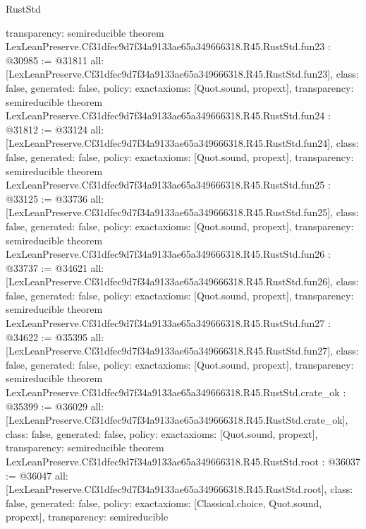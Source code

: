 \begin{lexlean}{RustStd}
\begin{coremodule}
{  transparency: semireducible
}
theorem LexLeanPreserve.Cf31dfec9d7f34a9133ae65a349666318.R45.RustStd.fun23 : @30985 := @31811 {
  all: [LexLeanPreserve.Cf31dfec9d7f34a9133ae65a349666318.R45.RustStd.fun23],
  class: false,
  generated: false,
  policy: exact{axioms: [Quot.sound, propext]},
  transparency: semireducible
}
theorem LexLeanPreserve.Cf31dfec9d7f34a9133ae65a349666318.R45.RustStd.fun24 : @31812 := @33124 {
  all: [LexLeanPreserve.Cf31dfec9d7f34a9133ae65a349666318.R45.RustStd.fun24],
  class: false,
  generated: false,
  policy: exact{axioms: [Quot.sound, propext]},
  transparency: semireducible
}
theorem LexLeanPreserve.Cf31dfec9d7f34a9133ae65a349666318.R45.RustStd.fun25 : @33125 := @33736 {
  all: [LexLeanPreserve.Cf31dfec9d7f34a9133ae65a349666318.R45.RustStd.fun25],
  class: false,
  generated: false,
  policy: exact{axioms: [Quot.sound, propext]},
  transparency: semireducible
}
theorem LexLeanPreserve.Cf31dfec9d7f34a9133ae65a349666318.R45.RustStd.fun26 : @33737 := @34621 {
  all: [LexLeanPreserve.Cf31dfec9d7f34a9133ae65a349666318.R45.RustStd.fun26],
  class: false,
  generated: false,
  policy: exact{axioms: [Quot.sound, propext]},
  transparency: semireducible
}
theorem LexLeanPreserve.Cf31dfec9d7f34a9133ae65a349666318.R45.RustStd.fun27 : @34622 := @35395 {
  all: [LexLeanPreserve.Cf31dfec9d7f34a9133ae65a349666318.R45.RustStd.fun27],
  class: false,
  generated: false,
  policy: exact{axioms: [Quot.sound, propext]},
  transparency: semireducible
}
theorem LexLeanPreserve.Cf31dfec9d7f34a9133ae65a349666318.R45.RustStd.crate_ok : @35399 := @36029 {
  all: [LexLeanPreserve.Cf31dfec9d7f34a9133ae65a349666318.R45.RustStd.crate_ok],
  class: false,
  generated: false,
  policy: exact{axioms: [Quot.sound, propext]},
  transparency: semireducible
}
theorem LexLeanPreserve.Cf31dfec9d7f34a9133ae65a349666318.R45.RustStd.root : @36037 := @36047 {
  all: [LexLeanPreserve.Cf31dfec9d7f34a9133ae65a349666318.R45.RustStd.root],
  class: false,
  generated: false,
  policy: exact{axioms: [Classical.choice, Quot.sound, propext]},
  transparency: semireducible
}


\end{coremodule}
\end{lexlean}
